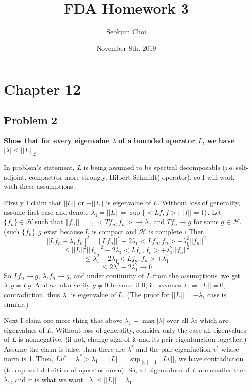 \documentclass{article}
\begin{document}
\title{FDA Homework 3}
\author{Seokjun Choi}
\date{November 8th, 2019}
\maketitle

\section{Chapter 12}
\subsection{Problem 2}
\textbf{
Show that for every eigenvalue $\lambda$ of a bounded operator $L$,
we have $|\lambda|\leq||L||_{\mathcal{L}}$.
}

In problem's statement, $L$ is being assumed to be spectral decomposable 
(i.e. self-adjoint, compact(or more strongly, Hilbert-Schmidt) operator), so I will work with these assumptions.

Firstly I claim that $||L||$ or $-||L||$ is eigenvalue of $L$.
Without loss of generality, assume first case and denote $\lambda_1=||L||=\sup\{<Lf,f>:||f||=1\}$.
Let $\{f_n\}\in\mathcal{H}$ such that $||f_n||=1$, $<Tf_n,f_n>\rightarrow\lambda_1$ 
and $Tf_n\rightarrow g$ for some $g\in\mathcal{H}$.
(such $\{f_n\},g$ exist because $L$ is compact and $\mathcal{H}$ is complete.)
Then
\[||Lf_n-\lambda_1 f_n||^2=||Lf_n||^2-2\lambda_1<Lf_n,f_n>+\lambda_1^2||f_n||^2\]
\[\leq ||L||^2||f_n||^2-2\lambda_1<Lf_n,f_n>+\lambda_1^2||f_n||^2\]
\[\leq \lambda_1^2-2\lambda_1<Lf_n,f_n>+\lambda_1^2\]
\[\leq 2\lambda_1^2-2\lambda_1^2\rightarrow 0\]
So $Lf_n\rightarrow g$, $\lambda_1 f_n\rightarrow g$, and under continuity of $L$ from the assumptions,
we get $\lambda_1 g = Lg$. And we also verify $g\neq0$ because if 0, it becomes $\lambda_1=||L||=0$, contradiction.
thus $\lambda_1$ is eigenvalue of $L$.
(The proof for $||L||=-\lambda_1$ case is similar.)

Next I claim one more thing that above $\lambda_1=\max{|\lambda|}$ over all $\lambda$s which are eigenvalues of $L$.
Without loss of generality, consider only the case all eigenvalues of $L$ is nonnegative. 
(if not, change sign of it and its pair eigenfunction together.)
Assume the claim is false, then there are $\lambda^*$ and the pair eigenfuction $v^*$ whose norm is 1.
Then, $Lv^*=\lambda^*>\lambda_1=||L||=\sup_{||v||=1}||Lv||$, we have contradiction (to sup and definition of operator norm).
So, all eigenvalues of $L$ are smaller then $\lambda_1$, and it is what we want,
$|\lambda|\leq||L||=\lambda_1$.
\end{document}
